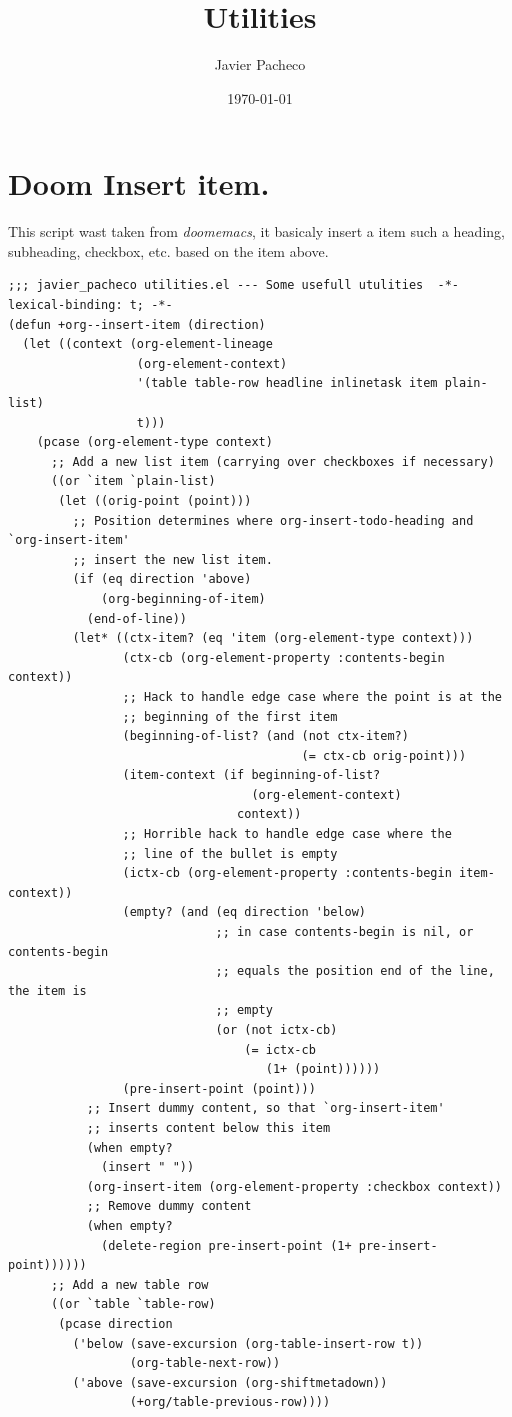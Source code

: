 \documentclass[11pt]{article}
\author{Javier Pacheco}
\date{\today}
\title{Utilities}
\begin{document}
\maketitle
\tableofcontents

\section{Doom Insert item.}
\label{sec:org1449028}
This script wast taken from \emph{doomemacs}, it basicaly insert a item such a heading, subheading, checkbox, etc. based on the item above.

\begin{verbatim}
;;; javier_pacheco utilities.el --- Some usefull utulities  -*- lexical-binding: t; -*-
(defun +org--insert-item (direction)
  (let ((context (org-element-lineage
                  (org-element-context)
                  '(table table-row headline inlinetask item plain-list)
                  t)))
    (pcase (org-element-type context)
      ;; Add a new list item (carrying over checkboxes if necessary)
      ((or `item `plain-list)
       (let ((orig-point (point)))
         ;; Position determines where org-insert-todo-heading and `org-insert-item'
         ;; insert the new list item.
         (if (eq direction 'above)
             (org-beginning-of-item)
           (end-of-line))
         (let* ((ctx-item? (eq 'item (org-element-type context)))
                (ctx-cb (org-element-property :contents-begin context))
                ;; Hack to handle edge case where the point is at the
                ;; beginning of the first item
                (beginning-of-list? (and (not ctx-item?)
                                         (= ctx-cb orig-point)))
                (item-context (if beginning-of-list?
                                  (org-element-context)
                                context))
                ;; Horrible hack to handle edge case where the
                ;; line of the bullet is empty
                (ictx-cb (org-element-property :contents-begin item-context))
                (empty? (and (eq direction 'below)
                             ;; in case contents-begin is nil, or contents-begin
                             ;; equals the position end of the line, the item is
                             ;; empty
                             (or (not ictx-cb)
                                 (= ictx-cb
                                    (1+ (point))))))
                (pre-insert-point (point)))
           ;; Insert dummy content, so that `org-insert-item'
           ;; inserts content below this item
           (when empty?
             (insert " "))
           (org-insert-item (org-element-property :checkbox context))
           ;; Remove dummy content
           (when empty?
             (delete-region pre-insert-point (1+ pre-insert-point))))))
      ;; Add a new table row
      ((or `table `table-row)
       (pcase direction
         ('below (save-excursion (org-table-insert-row t))
                 (org-table-next-row))
         ('above (save-excursion (org-shiftmetadown))
                 (+org/table-previous-row))))


\end{verbatim}
\end{document}
